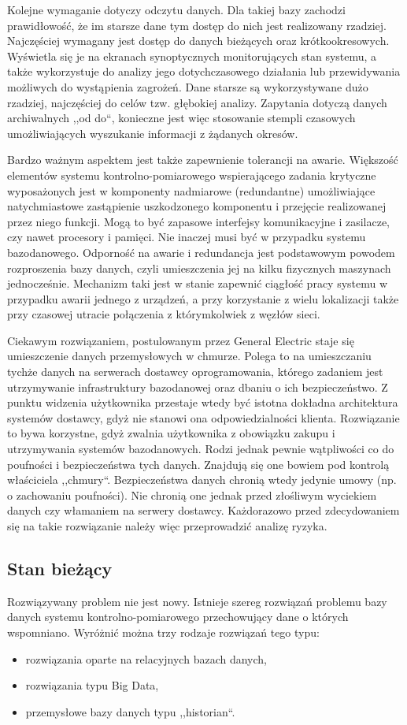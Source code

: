 \documentclass[a4paper,polish,12pt,twoside]{article}
\begin{document}
Kolejne wymaganie dotyczy odczytu danych. Dla takiej bazy zachodzi prawidłowość, że im starsze dane tym dostęp do nich jest realizowany rzadziej. Najczęściej wymagany jest dostęp do danych bieżących oraz krótkookresowych. Wyświetla się je na ekranach synoptycznych monitorujących stan systemu, a także wykorzystuje do analizy jego dotychczasowego działania lub przewidywania możliwych do wystąpienia zagrożeń. Dane starsze są wykorzystywane dużo rzadziej, najczęściej do celów tzw. głębokiej analizy. Zapytania dotyczą danych archiwalnych ,,od do``, konieczne jest więc stosowanie stempli czasowych umożliwiających wyszukanie informacji z żądanych okresów.

Bardzo ważnym aspektem jest także zapewnienie tolerancji na awarie. Większość elementów systemu kontrolno-pomiarowego wspierającego zadania krytyczne wyposażonych jest w komponenty nadmiarowe (redundantne) umożliwiające natychmiastowe zastąpienie uszkodzonego komponentu i przejęcie realizowanej przez niego funkcji. Mogą to być zapasowe interfejsy komunikacyjne i zasilacze, czy nawet procesory i pamięci. Nie inaczej musi być w przypadku systemu bazodanowego. Odporność na awarie i redundancja jest podstawowym powodem rozproszenia bazy danych, czyli umieszczenia jej na kilku fizycznych maszynach jednocześnie. Mechanizm taki jest w stanie zapewnić ciągłość pracy systemu w przypadku awarii jednego z urządzeń, a przy korzystanie z wielu lokalizacji także przy czasowej utracie połączenia z którymkolwiek z węzłów sieci.

Ciekawym rozwiązaniem, postulowanym przez General Electric\cite{gecloud} staje się umieszczenie danych przemysłowych w chmurze. Polega to na umieszczaniu tychże danych na serwerach dostawcy oprogramowania, którego zadaniem jest utrzymywanie infrastruktury bazodanowej oraz dbaniu o ich bezpieczeństwo. Z punktu widzenia użytkownika przestaje wtedy być istotna dokładna architektura systemów dostawcy, gdyż nie stanowi ona odpowiedzialności klienta. Rozwiązanie to bywa korzystne, gdyż zwalnia użytkownika z obowiązku zakupu i utrzymywania systemów bazodanowych. Rodzi jednak pewnie wątpliwości co do poufności i bezpieczeństwa tych danych. Znajdują się one bowiem pod kontrolą właściciela ,,chmury``. Bezpieczeństwa danych chronią wtedy jedynie umowy (np. o zachowaniu poufności). Nie chronią one jednak przed złośliwym wyciekiem danych czy włamaniem na serwery dostawcy. Każdorazowo przed zdecydowaniem się na takie rozwiązanie należy więc przeprowadzić analizę ryzyka.

\subsection{Stan bieżący}
Rozwiązywany problem nie jest nowy. Istnieje szereg rozwiązań problemu bazy danych systemu kontrolno-pomiarowego przechowujący dane o których wspomniano. Wyróżnić można trzy rodzaje rozwiązań tego typu:
	\begin{itemize}
		\item rozwiązania oparte na relacyjnych bazach danych,
		\item rozwiązania typu Big Data,
		\item przemysłowe bazy danych typu ,,historian``.
	\end{itemize}
	
\end{document}
